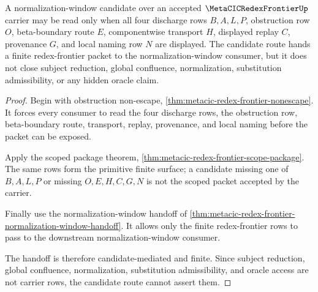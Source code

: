 \begin{theorem}
\label{thm:metacic-redex-frontier-candidate-normalization}
A normalization-window candidate over an accepted $\MetaCICRedexFrontierUp$ carrier may be read only when all four discharge rows $B,A,L,P$, obstruction row $O$, beta-boundary route $E$, componentwise transport $H$, displayed replay $C$, provenance $G$, and local naming row $N$ are displayed. The candidate route hands a finite redex-frontier packet to the normalization-window consumer, but it does not close subject reduction, global confluence, normalization, substitution admissibility, or any hidden oracle claim.
\end{theorem}
\begin{proof}
Begin with obstruction non-escape, \autoref{thm:metacic-redex-frontier-nonescape}. It forces every consumer to read the four discharge rows, the obstruction row, beta-boundary route, transport, replay, provenance, and local naming before the packet can be exposed.

Apply the scoped package theorem, \autoref{thm:metacic-redex-frontier-scope-package}. The same rows form the primitive finite surface; a candidate missing one of $B,A,L,P$ or missing $O,E,H,C,G,N$ is not the scoped packet accepted by the carrier.

Finally use the normalization-window handoff of \autoref{thm:metacic-redex-frontier-normalization-window-handoff}. It allows only the finite redex-frontier rows to pass to the downstream normalization-window consumer.

The handoff is therefore candidate-mediated and finite. Since subject reduction, global confluence, normalization, substitution admissibility, and oracle access are not carrier rows, the candidate route cannot assert them.
\end{proof}


